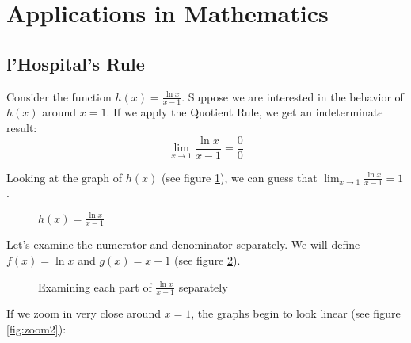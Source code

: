 \section{Applications in Mathematics}
\subsection{l'Hospital's Rule}
Consider the function $h(x) = \frac{\ln{x}}{x-1}$. Suppose we are interested 
in the behavior of $h(x)$ around $x=1$. If we apply the Quotient Rule, we get 
an indeterminate result: $$\lim_{x \to 1}\frac{\ln{x}}{x-1} = \frac{0}{0}$$ 

Looking at the graph of $h(x)$ (see figure \ref{fig:lhospital}), we can guess 
that $\lim_{x \to 1} \frac{\ln{x}}{x-1} = 1$. 

\begin{figure}[htbp]
\centering
{}
\caption{$h(x) = \frac{\ln{x}}{x - 1}$}
\label{fig:lhospital}
\end{figure}

Let's examine the numerator and denominator separately. We will define $f(x) = 
\ln{x}$ and $g(x) = x - 1$ (see figure \ref{fig:zoom1}). 

\begin{figure}[htbp]
\centering
{}
\caption{Examining each part of $\frac{\ln{x}}{x-1}$ separately}
\label{fig:zoom1}
\end{figure}

If we zoom in very close around $x=1$, the graphs begin to look linear (see 
figure \ref{fig:zoom2}):

